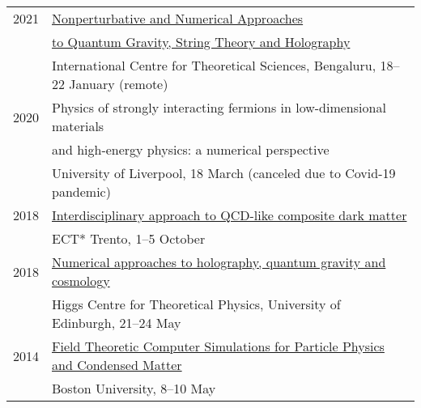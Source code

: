 \documentclass[10 pt]{article}
\begin{document}
\begin{tabular}[t]{cl}
  2021 & \href{https://www.icts.res.in/program/numstrings2021}{Nonperturbative and Numerical Approaches}                                                                             \\
       & \hfill \href{https://www.icts.res.in/program/numstrings2021}{to Quantum Gravity, String Theory and Holography}                                                              \\
       & International Centre for Theoretical Sciences, Bengaluru, 18--22 January (remote)                                                                                           \\[6 pt]
  2020 & Physics of strongly interacting fermions in low-dimensional materials                                                                                                       \\
       & \hfill and high-energy physics: a numerical perspective                                                                                                                     \\
       & University of Liverpool, 18 March (canceled due to Covid-19 pandemic)                                                                                                       \\[6 pt]
  2018 & \href{https://www.ectstar.eu/workshops/interdisciplinary-approach-to-qcd-like-composite-dark-matter/}{Interdisciplinary approach to QCD-like composite dark matter}         \\
       & ECT* Trento, 1--5 October                                                                                                                                                   \\[6 pt]
  2018 & \href{https://higgs.ph.ed.ac.uk/workshops/numerical-approaches-holography-quantum-gravity-and-cosmology}{Numerical approaches to holography, quantum gravity and cosmology} \\
       & Higgs Centre for Theoretical Physics, University of Edinburgh, 21--24 May                                                                                                   \\[6 pt]
  2014 & \href{http://blogs.bu.edu/ppcm/}{Field Theoretic Computer Simulations for Particle Physics and Condensed Matter}                                                            \\
       & Boston University, 8--10 May                                                                                                                                                \\[6 pt]

\end{tabular}
\end{document}
